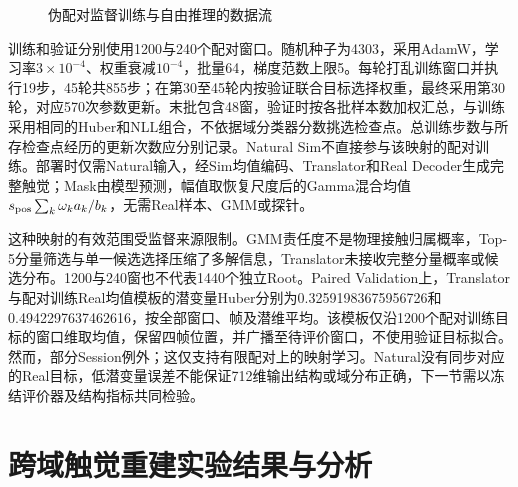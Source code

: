 \begin{figure}[htbp]
 \centering
 \caption{伪配对监督训练与自由推理的数据流}
 \label{fig:ch05_translator_paths}
\end{figure}

训练和验证分别使用1200与240个配对窗口。随机种子为4303，采用AdamW，学习率$3\times10^{-4}$、权重衰减$10^{-4}$，批量64，梯度范数上限5。每轮打乱训练窗口并执行19步，45轮共855步；在第30至45轮内按验证联合目标选择权重，最终采用第30轮，对应570次参数更新。末批包含48窗，验证时按各批样本数加权汇总，与训练采用相同的Huber和NLL组合，不依据域分类器分数挑选检查点。总训练步数与所存检查点经历的更新次数应分别记录。Natural Sim不直接参与该映射的配对训练。部署时仅需Natural输入，经Sim均值编码、Translator和Real Decoder生成完整触觉；Mask由模型预测，幅值取恢复尺度后的Gamma混合均值$s_{\rm pos}\sum_k\omega_k a_k/b_k$，无需Real样本、GMM或探针。

这种映射的有效范围受监督来源限制。GMM责任度不是物理接触归属概率，Top-5分量筛选与单一候选选择压缩了多解信息，Translator未接收完整分量概率或候选分布。1200与240窗也不代表1440个独立Root。Paired Validation上，Translator与配对训练Real均值模板的潜变量Huber分别为0.32591983675956726和0.4942297637462616，按全部窗口、帧及潜维平均。该模板仅沿1200个配对训练目标的窗口维取均值，保留四帧位置，并广播至待评价窗口，不使用验证目标拟合。然而，部分Session例外；这仅支持有限配对上的映射学习。Natural没有同步对应的Real目标，低潜变量误差不能保证712维输出结构或域分布正确，下一节需以冻结评价器及结构指标共同检验。



\section{跨域触觉重建实验结果与分析}
\label{sec:ch05_reconstruction_results}

